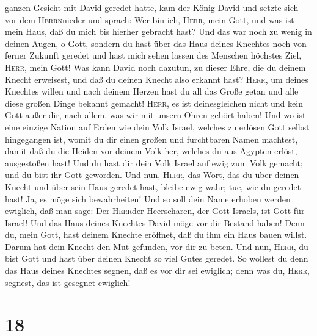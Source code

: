 ganzen Gesicht mit David geredet hatte,  kam der König
David und setzte sich vor dem \textsc{Herrn}nieder und sprach: Wer bin
ich, \textsc{Herr}, mein Gott, und was ist mein Haus, daß du mich bis
hierher gebracht hast?  Und das war noch zu wenig in
deinen Augen, o Gott, sondern du hast über das Haus deines Knechtes noch
von ferner Zukunft geredet und hast mich sehen lassen des Menschen
höchstes Ziel, \textsc{Herr}, mein Gott!  Was kann David
noch dazutun, zu dieser Ehre, die du deinem Knecht erweisest, und daß du
deinen Knecht also erkannt hast?  \textsc{Herr}, um
deines Knechtes willen und nach deinem Herzen hast du all das Große
getan und alle diese großen Dinge bekannt gemacht! 
\textsc{Herr}, es ist deinesgleichen nicht und kein Gott außer dir, nach
allem, was wir mit unsern Ohren gehört haben!  Und wo ist
eine einzige Nation auf Erden wie dein Volk Israel, welches zu erlösen
Gott selbst hingegangen ist, womit du dir einen großen und furchtbaren
Namen machtest, damit daß du die Heiden vor deinem Volk her, welches du
aus Ägypten erlöst, ausgestoßen hast!  Und du hast dir
dein Volk Israel auf ewig zum Volk gemacht; und du bist ihr Gott
geworden.  Und nun, \textsc{Herr}, das Wort, das du über
deinen Knecht und über sein Haus geredet hast, bleibe ewig wahr; tue,
wie du geredet hast!  Ja, es möge sich bewahrheiten! Und
so soll dein Name erhoben werden ewiglich, daß man sage: Der
\textsc{Herr}der Heerscharen, der Gott Israels, ist Gott für Israel! Und
das Haus deines Knechtes David möge vor dir Bestand haben!
 Denn du, mein Gott, hast deinem Knechte eröffnet, daß du
ihm ein Haus bauen willst. Darum hat dein Knecht den Mut gefunden, vor
dir zu beten.  Und nun, \textsc{Herr}, du bist Gott und
hast über deinen Knecht so viel Gutes geredet.  So
wollest du denn das Haus deines Knechtes segnen, daß es vor dir sei
ewiglich; denn was du, \textsc{Herr}, segnest, das ist gesegnet
ewiglich!

\hypertarget{section-17}{%
\section{18}\label{section-17}}

